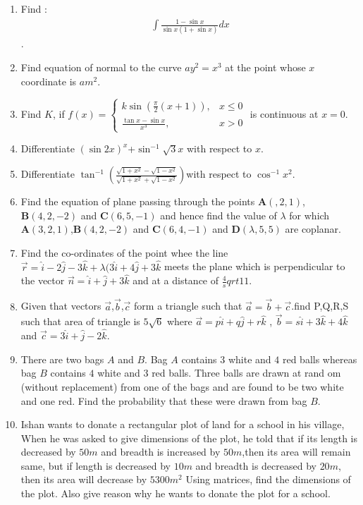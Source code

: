 \documentclass[12pt,-letter paper]{article}
\let\vec\mathbf{}
\let\vec\mathbf{}
\let\vec\mathbf{}
\begin{document}
\begin{enumerate}
\item Find : \begin{align*}\int\frac{1-\sin{x}}{\sin{x}(1+\sin{x})}dx\end{align*}.
\item Find equation of normal to the curve $ay^2=x^3$ at the point whose $x$ coordinate is $am^2$. 
\item Find $K$, if $f(x) = \begin{cases}
 k \sin\left(\frac{\pi}{2}(x+1)\right), & x \leq 0 \\
\frac{\tan {x}-\sin{x}}{x^3}, & x > 0 \end{cases}$ is continuous at $x = 0$.
\item Differentiate $(\sin2x)^x$+$\sin^{-1}\sqrt3x$ with respect to $x$.
\item Differentiate $\tan^{-1}{(\frac{\sqrt{1+x^2}-\sqrt{1-x^2}}{\sqrt{1+x^2}+\sqrt{1-x^2}}) }$with respect to $\cos^{-1}{x^2}$.
\item Find the equation of plane passing through the points $\vec{A}(,2,1)$,$\vec{B}(4,2,-2)$ and $\vec{C}(6,5,-1)$ and hence find the value of $\lambda $ for which $\vec{A}(3,2,1)$,$\vec{B}(4,2,-2)$ and $\vec{C}(6,4,-1)$ and $\vec{D}(\lambda,5,5)$ are coplanar.
\item Find the co-ordinates of the point whee the line $\overrightarrow{r}=\hat{i}-2\hat{j}-3\hat{k}+\lambda(3\hat{i}+4\hat{j}+3\hat{k}$ meets the plane which is perpendicular to the vector $\overrightarrow{n}=\hat{i}+\hat{j}+3\hat{k}$ and at a distance of $\frac{4}sqrt{11}$.
\item Given that vectors $\overrightarrow{a}$,$\overrightarrow{b}$,$\overrightarrow{c}$ form a triangle such that $\overrightarrow{a}=\overrightarrow{b}+\overrightarrow{c}$.find P,Q,R,S such that area  of triangle is $5\sqrt{6}$ where $\overrightarrow{a}=p\hat{i}+q\hat{j}+r\hat{k}$ , $\overrightarrow{b}=s\hat{i}+3\hat{k}+4\hat{k}$ and $\overrightarrow{c}=3\hat{i}+\hat{j}-2\hat{k}$. 
\item There are two bags $A$ and $B$. Bag $A$ contains $3$ white and $4$ red balls whereas bag $B$ contains $4$ white and $3$ red balls. Three balls are drawn at rand om (without replacement) from one of the bags and are found to be two white and one red. Find the probability that these were drawn from bag $B$.
\item Ishan wants to donate a rectangular plot of land for a school in his village, When he was asked to give dimensions of the plot, he told that  if its length is decreased by $50 m$ and breadth is increased by $50 m$,then its area will remain same, but if length is decreased by $10 m$ and breadth is decreased by $20 m$, then its area will decrease by $5300 m^ 2 $  Using matrices, find the dimensions of the plot. Also give reason  why he wants to donate the plot for a school.

\end{enumerate}
\end{document}
